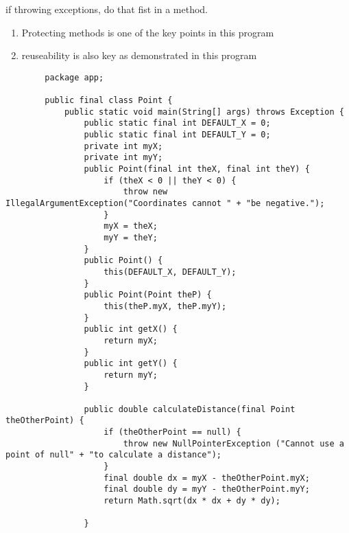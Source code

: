 \documentclass{article}
\begin{document}
if throwing exceptions, do that fist in a method.\\

    \begin{enumerate}
        \item Protecting methods is one of the key points in this program
        \item reuseability is also key as demonstrated in this program
    \end{enumerate}
    



    \begin{lstlisting}
        package app;

        public final class Point {
            public static void main(String[] args) throws Exception {
                public static final int DEFAULT_X = 0;
                public static final int DEFAULT_Y = 0;
                private int myX;
                private int myY;
                public Point(final int theX, final int theY) {
                    if (theX < 0 || theY < 0) {
                        throw new IllegalArgumentException("Coordinates cannot " + "be negative.");
                    }
                    myX = theX;
                    myY = theY;
                }
                public Point() {
                    this(DEFAULT_X, DEFAULT_Y);
                }
                public Point(Point theP) {
                    this(theP.myX, theP.myY);
                }
                public int getX() {
                    return myX;
                }
                public int getY() {
                    return myY;
                }
            
                public double calculateDistance(final Point theOtherPoint) {
                    if (theOtherPoint == null) {
                        throw new NullPointerException ("Cannot use a point of null" + "to calculate a distance");
                    }
                    final double dx = myX - theOtherPoint.myX;
                    final double dy = myY - theOtherPoint.myY;
                    return Math.sqrt(dx * dx + dy * dy);
            
                }
        

\end{lstlisting}
\end{document}
